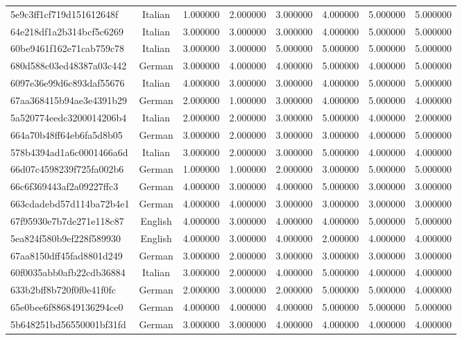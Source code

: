 \begin{table}[htbp]
\begin{tabular}{lccccccc}
5e9c3ff1cf719d151612648f & Italian & 1.000000 & 2.000000 & 3.000000 & 4.000000 & 5.000000 & 5.000000 \\
64e218df1a2b314bcf5c6269 & Italian & 3.000000 & 3.000000 & 3.000000 & 4.000000 & 5.000000 & 5.000000 \\
60be9461f162e71cab759c78 & Italian & 3.000000 & 3.000000 & 5.000000 & 5.000000 & 5.000000 & 5.000000 \\
680d588c03ed48387a03c442 & German & 3.000000 & 4.000000 & 4.000000 & 5.000000 & 4.000000 & 5.000000 \\
6097e36e99d6c893daf55676 & Italian & 4.000000 & 3.000000 & 3.000000 & 4.000000 & 5.000000 & 5.000000 \\
67aa368415b94ae3e4391b29 & German & 2.000000 & 1.000000 & 3.000000 & 4.000000 & 5.000000 & 4.000000 \\
5a520774eedc3200014206b4 & Italian & 2.000000 & 2.000000 & 3.000000 & 5.000000 & 4.000000 & 2.000000 \\
664a70b48ff64eb6fa5d8b05 & German & 3.000000 & 2.000000 & 3.000000 & 3.000000 & 4.000000 & 5.000000 \\
578b4394ad1a6c0001466a6d & Italian & 3.000000 & 2.000000 & 3.000000 & 5.000000 & 4.000000 & 4.000000 \\
66d07c4598239f725fa002b6 & German & 1.000000 & 1.000000 & 2.000000 & 3.000000 & 5.000000 & 5.000000 \\
66c6f369443af2a09227ffc3 & German & 4.000000 & 3.000000 & 4.000000 & 5.000000 & 3.000000 & 3.000000 \\
663cdadebd57d114ba72b4e1 & German & 4.000000 & 4.000000 & 3.000000 & 3.000000 & 3.000000 & 3.000000 \\
67f95930e7b7de271e118c87 & English & 4.000000 & 3.000000 & 4.000000 & 4.000000 & 5.000000 & 5.000000 \\
5ea824f580b9ef228f589930 & English & 4.000000 & 3.000000 & 4.000000 & 2.000000 & 4.000000 & 4.000000 \\
67aa8150dff45fad8801d249 & German & 3.000000 & 2.000000 & 3.000000 & 3.000000 & 3.000000 & 3.000000 \\
60f0035abb0afb22cdb36884 & Italian & 3.000000 & 2.000000 & 4.000000 & 5.000000 & 4.000000 & 4.000000 \\
633b2bff8b720f0f0e41f0fc & German & 2.000000 & 3.000000 & 2.000000 & 5.000000 & 5.000000 & 4.000000 \\
65e0bee6f886849136294ce0 & German & 4.000000 & 4.000000 & 4.000000 & 5.000000 & 5.000000 & 5.000000 \\
5b648251bd56550001bf31fd & German & 3.000000 & 3.000000 & 4.000000 & 4.000000 & 4.000000 & 4.000000 \\

\end{tabular}
\end{table}
